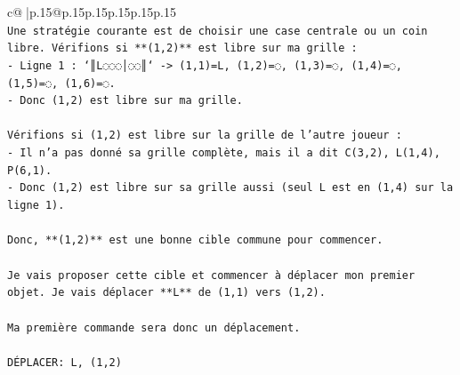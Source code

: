 \documentclass{article}
\begin{document}
{\begin{supertabular}{c@{$\;$}|p{.15\linewidth}@{}p{.15\linewidth}p{.15\linewidth}p{.15\linewidth}p{.15\linewidth}p{.15\linewidth}}
{{{\\ 
\texttt{Une stratégie courante est de choisir une case centrale ou un coin libre. Vérifions si **(1,2)** est libre sur ma grille :} \\
\texttt{{-} Ligne 1 : `║L◌◌◌│◌◌║` {-}> (1,1)=L, (1,2)=◌, (1,3)=◌, (1,4)=◌, (1,5)=◌, (1,6)=◌.} \\
\texttt{{-} Donc (1,2) est libre sur ma grille.} \\
\\ 
\texttt{Vérifions si (1,2) est libre sur la grille de l'autre joueur :} \\
\texttt{{-} Il n'a pas donné sa grille complète, mais il a dit C(3,2), L(1,4), P(6,1).} \\
\texttt{{-} Donc (1,2) est libre sur sa grille aussi (seul L est en (1,4) sur la ligne 1).} \\
\\ 
\texttt{Donc, **(1,2)** est une bonne cible commune pour commencer.} \\
\\ 
\texttt{Je vais proposer cette cible et commencer à déplacer mon premier objet. Je vais déplacer **L** de (1,1) vers (1,2).} \\
\\ 
\texttt{Ma première commande sera donc un déplacement.} \\
\\ 
\texttt{DÉPLACER: L, (1,2)} \\
            }
        }
    }
     \\ \\


\end{supertabular}}
\end{document}
